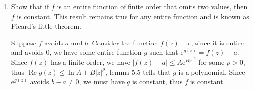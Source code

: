 \documentclass[11pt]{report}
\theoremstyle{mythm}
\let\oldendproof\endproof
\renewenvironment{proof}[1][\proofname]{%
  \oldproof[\normalfont \bfseries #1]%
}{\oldendproof}
\renewcommand*{\proofname}{Proof}
\theoremstyle{myans}
\newtheorem*{answer}{Answer}
\newcommand{\mi}{\mathrm{i}}
\newcommand{\me}{\mathrm{e}}
\renewcommand{\Re}{\operatorname{Re}}
\begin{document}
\begin{enumerate}
\begin{enumerate}
\begin{answer}
\begin{align*}
        &= \me^{P(z)} z \prod_{n\neq 0} \left(1 - \frac{z}{2\pi \mi n}\right)\me^{z/2\pi \mi n}\\
        &= \me^{P(z)} z \prod_{n=1}^\infty \left( 1 - \left(\frac{z}{2\pi \mi n}\right)^2 \right)\\
        &= \me^{P(z)} z \prod_{n=1}^\infty \left( 1 + \frac{z^2}{4\pi^2 n^2} \right)\\
        \frac{\me^z-1}{z} &= \me^{P(z)} \prod_{n=1}^\infty \left( 1 + \frac{z^2}{4\pi^2 n^2} \right),
      \end{align*}
      since $\mathrm{LHS} = 1 + z/2 + O(z^2)$, we have
      \[ \me^{P(z)} (1 + O(z^2)) = 1 + \frac z 2 + O(z^2), \]
      since $\deg P\leq 1$, we have $P(z) = z/2$. In conclusion,
      \[ \me^z - 1 = z\me^{z/2} \prod_{n=1}^\infty \left(1 + \frac{z^2}{4\pi^2 n^2}\right). \]
    \end{answer}
    \item $\cos \pi z$.
    \begin{answer}
      Since $\cos \pi z$ has the order of growth $1$, and the zeroes are $n + 1/2$,
      the Hadamard product has the form
      \begin{align*}
        \cos \pi z &= \me^{P(z)} \prod_{n=-\infty}^{\infty} \left(1 - \frac{z}{n+1/2}\right)\me^{z/(n+1/2)}\\
        &= \me^{P(z)} \prod_{n=1}^{\infty} \left( 1 - \frac{4z^2}{(2n+1)^2} \right),
      \end{align*}
      considering the coefficients on the $0$th and $1$st term, we have $P(z) = 0$, thus
      \[ \cos \pi z = \prod_{n=1}^{\infty} \left( 1 - \frac{4z^2}{(2n+1)^2} \right). \]
    \end{answer}
  \end{enumerate}
  \item Show that if $f$ is an entire function of finite order that omits two values,
  then $f$ is constant. This result remains true for any entire function and is known as
  Picard's little theorem.
  \begin{proof}
    Suppose $f$ avoids $a$ and $b$. Consider the function $f(z) - a$, since it is entire and avoids $0$,
    we have some entire function $g$ such that $\me^{g(z)} = f(z) - a$. Since $f(z)$ has a finite order,
    we have $|f(z)-a| \leq A \me^{B|z|^\rho}$ for some $\rho >0$, thus $\Re g(z) \leq \ln A + B |z|^\rho$,
    lemma 5.5 tells that $g$ is a polynomial. Since $\me^{g(z)}$ avoids $b-a\neq 0$, 
    we must have $g$ is constant, thus $f$ is constant.
  \end{proof}

\end{enumerate}
\end{document}
